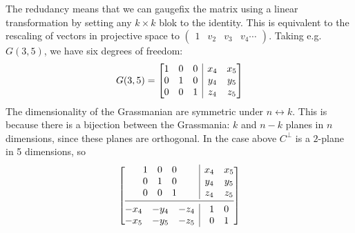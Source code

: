\documentclass[letter,11pt]{article}
\begin{document}
The redudancy means that we can gaugefix the matrix using a linear transformation by setting any $k\times k$ blok to the identity. This is equivalent to the rescaling of vectors in projective space to $\begin{pmatrix}
1 & v_2 & v_3 & v_4 \cdots
\end{pmatrix}$. Taking e.g. $G(3,5)$, we have six degrees of freedom:
\begin{equation}G(3,5) = 
\left[ \begin{array}{@{}c|c@{}}
	\begin{matrix}
		1 & 0 &  0 \\
		0 & 1 &  0 \\
		0 & 0 &  1 \\
	\end{matrix} 
	& 	\begin{matrix}
		x_4 & x_5  \\
		y_4 & y_5  \\
		z_4 & z_5  \\
	\end{matrix}  \\
\end{array} \right]
\end{equation}
The dimensionality of the Grassmanian are symmetric under $n\leftrightarrow k$. This is because there is a bijection between the Grassmania: $k$ and $n-k$ planes in $n$ dimensions, since these planes are orthogonal. In the case above $C^{\perp}$ is a $2$-plane in 5 dimensions, so
\begin{equation}
	\left[ \begin{array}{@{}c|c@{}}
		\begin{matrix}
			1 & 0 &  0 \\
			0 & 1 &  0 \\
			0 & 0 &  1 \\
		\end{matrix} 
		& 	\begin{matrix}
			x_4 & x_5  \\
			y_4 & y_5  \\
			z_4 & z_5  \\
		\end{matrix}  \\
	\cmidrule[0.4pt]{1-2}
		\begin{matrix}
		-x_4 & -y_4 & -z_4  \\
		-x_5 & -y_5 & -z_5 \\
	\end{matrix} 
	& 	\begin{matrix}
	1 & 0  \\
	0 & 1  \\
\end{matrix} 
	\end{array} \right]
\end{equation}
\end{document}
